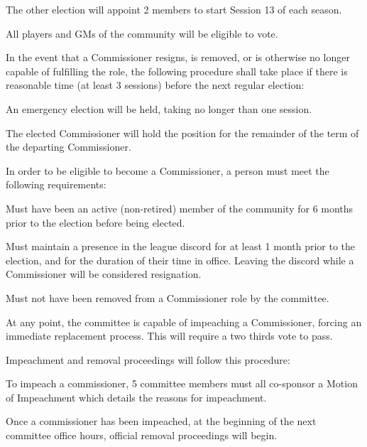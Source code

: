 \begin{deepEnumerate}
\begin{deepEnumerate}
		\item The other election will appoint 2 members to start Session 13 of each season.
		\item All players and GMs of the community will be eligible to vote.
	\end{deepEnumerate}
	\item In the event that a Commissioner resigns, is removed, 
	or is otherwise no longer capable of fulfilling the role, 
	the following procedure shall take place 
	if there is reasonable time (at least 3 sessions) 
	before the next regular election:
	\begin{deepEnumerate}
		\item An emergency election will be held, taking no longer than one session.
		\item The elected Commissioner will hold the position for the remainder of the term of the departing Commissioner.
	\end{deepEnumerate}
	\item In order to be eligible to become a Commissioner, 
	a person must meet the following requirements:
	\begin{deepEnumerate}
		\item Must have been an active (non-retired) member of the community for 6 months prior to the election before being elected.
		\item Must maintain a presence in the league discord 
		for at least 1 month prior to the election, 
		and for the duration of their time in office. 
		Leaving the discord while a Commissioner will be considered resignation.
		\item Must not have been removed from a Commissioner role by the committee.	
	\end{deepEnumerate}
	\item At any point, the committee is capable of impeaching a Commissioner, 
	forcing an immediate replacement process. 
	This will require a two thirds vote to pass.
	\begin{deepEnumerate}
		\item Impeachment and removal proceedings will follow this procedure:
		\begin{deepEnumerate}
			\item To impeach a commissioner, 
			5 committee members must all co-sponsor a Motion of Impeachment 
			which details the reasons for impeachment.
			\item Once a commissioner has been impeached, 
			at the beginning of the next committee office hours, 
			official removal proceedings will begin. 

\end{deepEnumerate}
\end{deepEnumerate}
\end{deepEnumerate}
